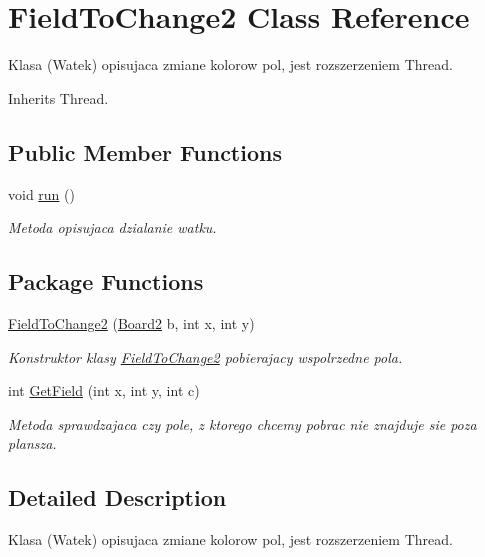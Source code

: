 \hypertarget{classFieldToChange2}{\section{Field\-To\-Change2 Class Reference}
\label{classFieldToChange2}
}


Klasa (Watek) opisujaca zmiane kolorow pol, jest rozszerzeniem Thread.  




Inherits Thread.

\subsection*{Public Member Functions}
\begin{DoxyCompactItemize}
\item 
void \hyperlink{classFieldToChange2_ab3527ba3fa80126a7d0350e4cf9c8e7f}{run} ()
\begin{DoxyCompactList}\small\item\em Metoda opisujaca dzialanie watku. \end{DoxyCompactList}\end{DoxyCompactItemize}
\subsection*{Package Functions}
\begin{DoxyCompactItemize}
\item 
\hyperlink{classFieldToChange2_a6f4a2638a307f63b349edfa719a8e8e6}{Field\-To\-Change2} (\hyperlink{classBoard2}{Board2} b, int x, int y)
\begin{DoxyCompactList}\small\item\em Konstruktor klasy \hyperlink{classFieldToChange2}{Field\-To\-Change2} pobierajacy wspolrzedne pola. \end{DoxyCompactList}\item 
int \hyperlink{classFieldToChange2_a0b9f1375b65be010f68fc1028166ad14}{Get\-Field} (int x, int y, int c)
\begin{DoxyCompactList}\small\item\em Metoda sprawdzajaca czy pole, z ktorego chcemy pobrac nie znajduje sie poza plansza. \end{DoxyCompactList}\end{DoxyCompactItemize}


\subsection{Detailed Description}
Klasa (Watek) opisujaca zmiane kolorow pol, jest rozszerzeniem Thread. 



